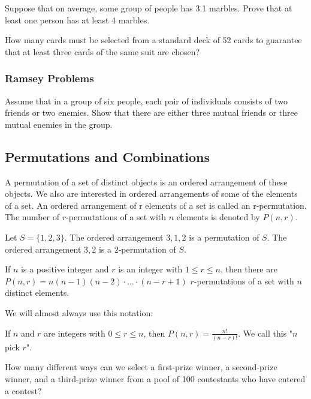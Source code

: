 \begin{exmp} Suppose that on average, some group of people has 3.1 marbles. Prove that at least one person has at least 4 marbles.
\vspace{2cm}
\end{exmp}
\begin{exmp}
    How many cards must be selected from a standard deck of 52 cards to guarantee that at least three cards of the same suit are chosen?
\vspace{3cm}
\end{exmp}
\subsubsection{Ramsey Problems}
\begin{exmp}
    Assume that in a group of six people, each pair of individuals consists of two friends or two enemies. Show that there are either three mutual friends or three mutual enemies in the group.
    \vspace{3cm}
\end{exmp}

\newpage

\subsection{Permutations and Combinations}
\begin{defn}[Permutation]
A permutation of a set of distinct objects is an ordered arrangement of these objects.
We also are interested in ordered arrangements of some of the elements of a set. An ordered
arrangement of r elements of a set is called an r-permutation.
    The number of $r$-permutations of a set with $n$ elements is denoted by $P(n, r)$.


\end{defn}
\begin{exmp}
    Let $S = \{1, 2, 3\}$. The ordered arrangement $3, 1, 2$ is a permutation of $S$. The ordered arrangement $3, 2$ is a $2$-permutation of $S$.
\end{exmp}

\begin{thm}
    If $n$ is a positive integer and $r$ is an integer with $1 \leq r \leq n$, then there are $P(n, r) = n(n - 1)(n - 2) \cdot \ldots \cdot (n - r + 1)$ $r$-permutations of a set with $n$ distinct elements.
\end{thm}
We will almost always use this notation:
\begin{defn}
    If $n$ and $r$ are integers with $0 \leq r \leq n$, then $P(n, r) = \frac{n!}{(n - r)!}$. We call this "$n$ pick $r$".
\end{defn}
\begin{exmp}
How many different ways can we select a first-prize winner, a second-prize winner, and a third-prize winner from a pool of 100 contestants who have entered a contest?
\vspace{2cm}
\end{exmp}


